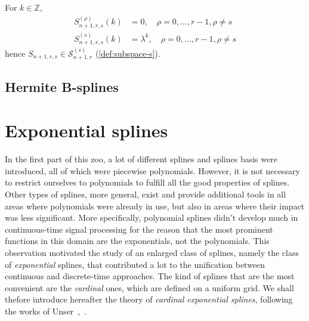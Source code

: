 \begin{prop}\label{prop:snrs}
  For $k \in \mathbb{Z}$,
  \begin{align*}
    S_{n+1,r,s}^{(\rho)}(k) &= 0, \quad \rho=0, \ldots, r-1, \rho \neq s \\
    S_{n+1,r,s}^{(s)}(k) &= \lambda^k, \quad \rho=0, \ldots, r-1, \rho \neq s
  \end{align*}
  hence $S_{n+1,r,s} \in \mathscr{S}_{n+1,r}^{(s)}$ (\ref{def:subspace-s}).
\end{prop}

\subsection{Hermite B-splines}

\section{Exponential splines}

In the first part of this zoo, a lot of different splines and splines basis were introduced, all of which were piecewise 
polynomials. However, it is not necessary to restrict ourselves to polynomials to fulfill all the good properties of 
splines. Other types of splines, more general, exist and provide additional tools in all areas where polynomials were 
already in use, but also in areas where their impact was less significant. More specifically, polynomial splines didn't 
develop much in continuous-time signal processing for the reason that the most prominent functions in this domain are 
the exponentials, not the polynomials. This observation motivated the study of an enlarged class of splines, namely the 
class of \emph{exponential} splines, that contributed a lot to the unification between continuous and discrete-time 
approaches. The kind of splines that are the most convenient are the \emph{cardinal} ones, which are defined on a 
uniform grid. We shall thefore introduce hereafter the theory of \emph{cardinal exponential splines}, following the 
works of Unser~\cite{unser_cardinal_2005},~\cite{unser_cardinal_2005-1}.

